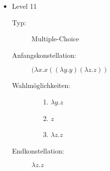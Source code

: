 \begin{itemize}
	\item{Level 11} 
		\begin{description}
			\item[Typ:] Multiple-Choice 
			\item[Anfangskonstellation:] \((\lambda x . x ((\lambda y . y) (\lambda z . z ) ) \)    
			\item[Wahlmöglichkeiten:] \hfill
				\begin{itemize}
					\item[1.] \( \lambda y . z\) 
					\item[2.] \( z \) 
					\item[3.] \(\lambda z . z \)
				\end{itemize}
			\item[Endkonstellation:]\( \lambda z . z\)
		\end{description}


\end{itemize}
